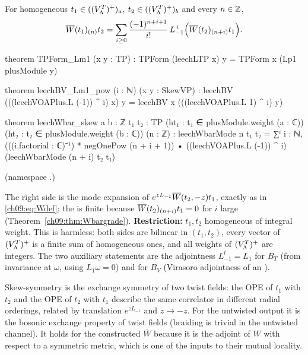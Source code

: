 \begin{theorem}\label{ch09:thm:skew}
For homogeneous $t_1\in((V_{\Lambda}^{T})^{+})_a$, $t_2\in((V_{\Lambda}^{T})^{+})_b$ and every $n\in{\mathbb{Z}}$,
\begin{equation*}
\overline{W}(t_1)_{(n)}t_2=\sum_{i\ge0}\frac{(-1)^{n+i+1}}{i!}\,L_{-1}^{\,i}\Big(\overline{W}(t_2)_{(n+i)}t_1\Big).
\end{equation*}
\end{theorem}
\begin{leancode}
theorem TPForm_Lm1 (x y : TP) : TPForm (leechLTP x) y = TPForm x (Lp1 plusModule y)

theorem leechBV_Lm1_pow (i : ℕ) (x y : SkewVP) :
    leechBV (((leechVOAPlus.L (-1)) ^ i) x) y = leechBV x (((leechVOAPlus.L 1) ^ i) y)

theorem leechWbar_skew {a b : ℤ} {t₁ t₂ : TP} (ht₁ : t₁ ∈ plusModule.weight (a : ℂ))
    (ht₂ : t₂ ∈ plusModule.weight (b : ℂ)) (n : ℤ) :
    leechWbarMode n t₁ t₂ = ∑ᶠ i : ℕ, (((i.factorial : ℂ)⁻¹) * negOnePow (n + i + 1)) •
      ((leechVOAPlus.L (-1)) ^ i) (leechWbarMode (n + i) t₂ t₁)
\end{leancode}
(namespace .)
\begin{dictionary}
The right side is the mode expansion of $e^{zL_{-1}}\overline{W}(t_2,-z)t_1$, exactly as in
\eqref{ch09:eq:Wdef}; the  is finite because $\overline{W}(t_2)_{(n+i)}t_1=0$ for $i$ large
(Theorem~\ref{ch09:thm:Wbargrade}). \textbf{Restriction:} $t_1,t_2$ homogeneous of integral weight.
This is harmless: both sides are bilinear in $(t_1,t_2)$, every vector of $(V_{\Lambda}^{T})^{+}$ is a finite sum
of homogeneous ones, and all weights of $(V_{\Lambda}^{T})^{+}$ are integers. The two auxiliary statements are
the adjointness $L_{-1}^t=L_1$ for $B_T$ (from invariance at $\omega$, using $L_1\omega=0$) and for
$B_V$ (Virasoro adjointness of an ).
\end{dictionary}

\begin{physics}
Skew-symmetry is the exchange symmetry of two twist fields: the OPE of $t_1$ with $t_2$ and the OPE of $t_2$ with $t_1$ describe the same correlator in different radial orderings, related by translation $e^{zL_{-1}}$ and $z\to-z$. For the untwisted output it is the bosonic exchange property of twist fields (braiding is trivial in the untwisted channel). It holds for the constructed $\overline W$ because it is the adjoint of $W$ with respect to a symmetric metric, which is one of the inputs to their mutual locality.
\end{physics}

